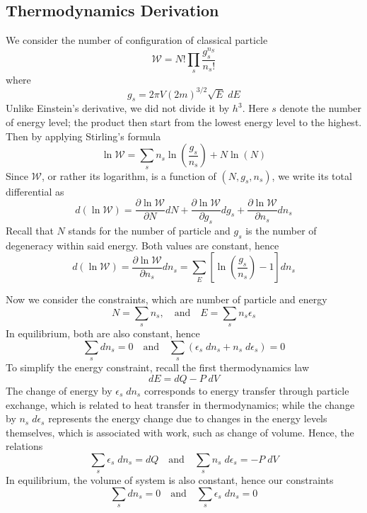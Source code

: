 \documentclass[../../../Main.tex]{subfiles}
\begin{document}
\subsection{Thermodynamics Derivation}
We consider the number of configuration of classical particle
\begin{equation*}
    \mathcal{W}=N! \prod_{s} \frac{g_s^{n_S}}{n_s!}
\end{equation*}
where 
\begin{equation*}
    g_s=2\pi V(2m)^{3/2}\sqrt{E}\;dE
\end{equation*}
Unlike Einstein's derivative, we did not divide it by $h^3$. Here $s$ denote the number of energy level; the product then start from the lowest energy level to the highest. Then by applying Stirling's formula
\begin{equation*}
    \ln \mathcal{W}=\sum_s n_s \ln \left(\frac{g_s}{n_s}\right)+ N\ln (N)
\end{equation*}
Since $\mathcal{W}$, or rather its logarithm, is a function of $(N,g_s,n_s)$, we write its total differential as 
\begin{equation*}
    d(\ln \mathcal{W})=\frac{\partial \ln \mathcal{W}}{\partial N}dN+\frac{\partial \ln \mathcal{W}}{\partial g_s}dg_s+ \frac{\partial \ln \mathcal{W}}{\partial n_s}dn_s
\end{equation*} 
Recall that $N$ stands for the number of particle and $g_s$ is the number of degeneracy within said energy. Both values are constant, hence
\begin{equation*}
    d(\ln \mathcal{W})=\frac{\partial \ln \mathcal{W}}{\partial n_s}dn_s=\sum_E \left[\ln \left(\frac{g_s}{n_s}\right)-1 \right] dn_s
\end{equation*}

Now we consider the constraints, which are number of particle and energy
\begin{equation*}
    N=\sum_s n_s,\quad\text{and}\quad E=\sum_s n_s\epsilon_s 
\end{equation*}
In equilibrium, both are also constant, hence
\begin{equation*}
    \sum_s dn_s=0 \quad\text{and}\quad\sum_s \left( \epsilon_s \;dn_s +n_s\;d\epsilon_s \right)=0
\end{equation*}
To simplify the energy constraint, recall the first thermodynamics law
\begin{equation*}
    dE=dQ-P\;dV
\end{equation*} 
The change of energy by $\epsilon_s \;dn_s $ corresponds to energy transfer through particle exchange, which is related to heat transfer in thermodynamics; while the change by $n_s\;d\epsilon_s$ represents the energy change due to changes in the energy levels themselves, which is associated with work, such as change of volume. Hence, the relations 
\begin{equation*}
    \sum_s\epsilon_s \;dn_s=dQ \quad\text{and}\quad\sum_s n_s\;d\epsilon_s =-P\;dV
\end{equation*}
In equilibrium, the volume of system is also constant, hence our constraints
\begin{equation*}
    \sum_s dn_s=0 \quad\text{and}\quad \sum_s\epsilon_s \;dn_s=0
\end{equation*}
\end{document}
